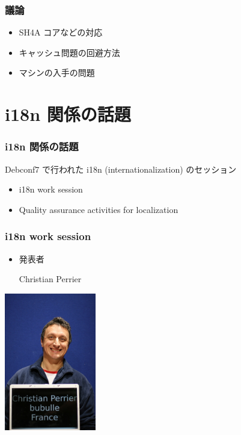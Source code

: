 \documentclass[cjk,dvipdfmx,12pt]{beamer}
\begin{document}
\begin{frame} 
\frametitle{議論}
  \begin{itemize}
    \item SH4A コアなどの対応
    \item キャッシュ問題の回避方法
    \item マシンの入手の問題
  \end{itemize}
\end{frame}

\section{i18n 関係の話題}

\begin{frame}
\frametitle{i18n 関係の話題} 
Debconf7 で行われた i18n (internationalization) のセッション
  \begin{itemize}
     \item i18n work session
     \item Quality assurance activities for localization    
  \end{itemize}
\end{frame}


\begin{frame}
\frametitle{i18n work session} 
  \begin{minipage}{0.4\hsize}
    \begin{itemize}
      \item 発表者

	Christian Perrier
    \end{itemize}
  \end{minipage}
  \begin{minipage}{0.4\hsize}
    \includegraphics[width=4cm]{image200707/bubulle.jpg}  
  \end{minipage}
\end{frame}
\end{document}

